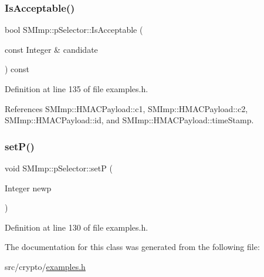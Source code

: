 \subsubsection{\texorpdfstring{Is\+Acceptable()}{IsAcceptable()}}
{\footnotesize\ttfamily bool S\+M\+Imp\+::p\+Selector\+::\+Is\+Acceptable (\begin{DoxyParamCaption}\item[{const Integer \&}]{candidate }\end{DoxyParamCaption}) const\hspace{0.3cm}{\ttfamily [inline]}}



Definition at line 135 of file examples.\+h.



References S\+M\+Imp\+::\+H\+M\+A\+C\+Payload\+::c1, S\+M\+Imp\+::\+H\+M\+A\+C\+Payload\+::c2, S\+M\+Imp\+::\+H\+M\+A\+C\+Payload\+::id, and S\+M\+Imp\+::\+H\+M\+A\+C\+Payload\+::time\+Stamp.

\mbox{\label{classSMImp_1_1pSelector_a095412eb63d8e76b6bb3e93cf139ead0}} 
\subsubsection{\texorpdfstring{set\+P()}{setP()}}
{\footnotesize\ttfamily void S\+M\+Imp\+::p\+Selector\+::setP (\begin{DoxyParamCaption}\item[{Integer}]{newp }\end{DoxyParamCaption})\hspace{0.3cm}{\ttfamily [inline]}}



Definition at line 130 of file examples.\+h.



The documentation for this class was generated from the following file\+:\begin{DoxyCompactItemize}
\item 
src/crypto/\hyperlink{examples_8h}{examples.\+h}\end{DoxyCompactItemize}
